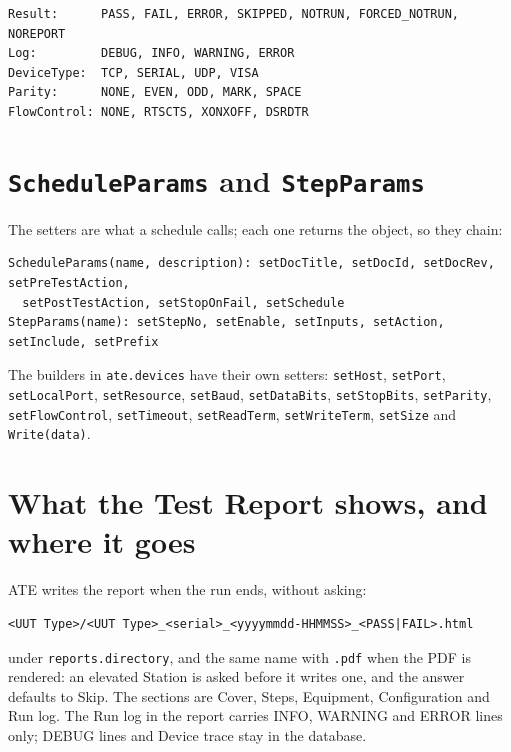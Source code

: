 \begingroup\footnotesize
\begin{verbatim}
Result:      PASS, FAIL, ERROR, SKIPPED, NOTRUN, FORCED_NOTRUN, NOREPORT
Log:         DEBUG, INFO, WARNING, ERROR
DeviceType:  TCP, SERIAL, UDP, VISA
Parity:      NONE, EVEN, ODD, MARK, SPACE
FlowControl: NONE, RTSCTS, XONXOFF, DSRDTR
\end{verbatim}
\endgroup

\section{\texttt{ScheduleParams} and \texttt{StepParams}}

The setters are what a schedule calls; each one returns the object, so they chain:

\begingroup\footnotesize
\begin{verbatim}
ScheduleParams(name, description): setDocTitle, setDocId, setDocRev, setPreTestAction,
  setPostTestAction, setStopOnFail, setSchedule
StepParams(name): setStepNo, setEnable, setInputs, setAction, setInclude, setPrefix
\end{verbatim}
\endgroup

The builders in \texttt{ate.devices} have their own setters: \texttt{setHost},
\texttt{setPort}, \texttt{setLocalPort}, \texttt{setResource}, \texttt{setBaud},
\texttt{setDataBits}, \texttt{setStopBits}, \texttt{setParity}, \texttt{setFlowControl},
\texttt{setTimeout}, \texttt{setReadTerm}, \texttt{setWriteTerm}, \texttt{setSize} and
\texttt{Write(data)}.

\section{What the Test Report shows, and where it goes}

ATE writes the report when the run ends, without asking:

\begingroup\footnotesize
\begin{verbatim}
<UUT Type>/<UUT Type>_<serial>_<yyyymmdd-HHMMSS>_<PASS|FAIL>.html
\end{verbatim}
\endgroup

under \texttt{reports.directory}, and the same name with \texttt{.pdf} when the PDF is
rendered: an elevated Station is asked before it writes one, and the answer defaults to Skip.
The sections are Cover,
Steps, Equipment, Configuration and Run log. The Run log in the report carries INFO, WARNING
and ERROR lines only; DEBUG lines and Device trace stay in the database.

